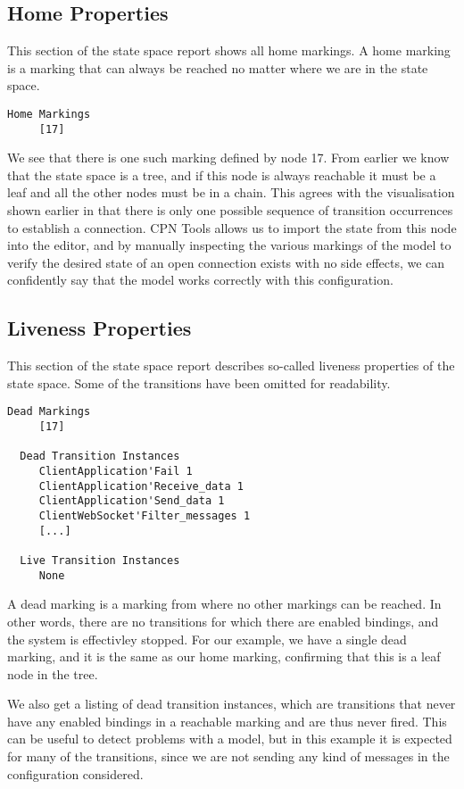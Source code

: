 	\subsection{Home Properties}
	This section of the state space report shows all home markings. A home marking
	is a marking that can always be reached no matter where we are in the state space. 
	\begin{lstlisting}[language={},float]
  Home Markings
     [17]
	\end{lstlisting}
	We see that there is one such marking defined by node 17. From earlier we know
	that the state space is a tree, and if this node is always reachable it must be a leaf
	and all the other nodes must be in a chain. This agrees with the visualisation
	shown earlier in  that there is only one possible
	sequence of transition occurrences to establish a connection. CPN Tools
	allows us to import the state from this node into the editor, and by manually
	inspecting the various markings of the model to verify the desired state of
	an open connection exists with no side effects, we can confidently say that the
	model works correctly with this configuration.
	
	\subsection{Liveness Properties}
	This section of the state space report describes so-called liveness properties
	of the state space.
	Some of the transitions have been omitted for readability.
	
	\begin{lstlisting}[language={},float]
  Dead Markings
     [17]

  Dead Transition Instances
     ClientApplication'Fail 1
     ClientApplication'Receive_data 1
     ClientApplication'Send_data 1
     ClientWebSocket'Filter_messages 1
     [...]

  Live Transition Instances
     None
	\end{lstlisting}
	
	A dead marking is a marking from where no other markings can be reached.
	 In other words, there are no transitions
	for which there are enabled bindings, and the system is effectivley stopped.
	For our example, we have a single dead marking, and it is the same as our home
	marking, confirming that this is a leaf node in the tree.
	
	We also get a listing of dead transition instances, which are transitions that
	never have any enabled bindings in a reachable marking and are thus never
	fired. This can be useful to detect problems with a model, but in this example
	it is expected for many of the transitions, since we are not sending any kind
	of messages in the configuration considered.
	

